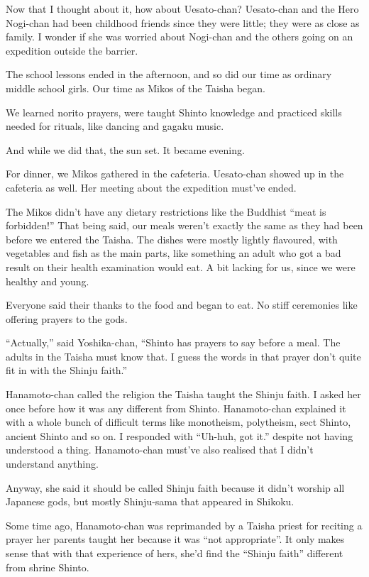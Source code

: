 Now that I thought about it, how about Uesato-chan? Uesato-chan and the Hero Nogi-chan had been childhood friends since they were little; they were as close as family. I wonder if she was worried about Nogi-chan and the others going on an expedition outside the barrier.

The school lessons ended in the afternoon, and so did our time as ordinary middle school girls. Our time as Mikos of the Taisha began.

We learned norito prayers, were taught Shinto knowledge and practiced skills needed for rituals, like dancing and gagaku music.

And while we did that, the sun set. It became evening.

For dinner, we Mikos gathered in the cafeteria. Uesato-chan showed up in the cafeteria as well. Her meeting about the expedition must've ended.

The Mikos didn't have any dietary restrictions like the Buddhist ``meat is forbidden!'' That being said, our meals weren't exactly the same as they had been before we entered the Taisha. The dishes were mostly lightly flavoured, with vegetables and fish as the main parts, like something an adult who got a bad result on their health examination would eat. A bit lacking for us, since we were healthy and young.

Everyone said their thanks to the food and began to eat. No stiff ceremonies like offering prayers to the gods.

``Actually,'' said Yoshika-chan, ``Shinto has prayers to say before a meal. The adults in the Taisha must know that. I guess the words in that prayer don't quite fit in with the Shinju faith.''

Hanamoto-chan called the religion the Taisha taught the Shinju faith. I asked her once before how it was any different from Shinto. Hanamoto-chan explained it with a whole bunch of difficult terms like monotheism, polytheism, sect Shinto, ancient Shinto and so on. I responded with ``Uh-huh, got it.'' despite not having understood a thing. Hanamoto-chan must've also realised that I didn't understand anything.

Anyway, she said it should be called Shinju faith because it didn't worship all Japanese gods, but mostly Shinju-sama that appeared in Shikoku.

Some time ago, Hanamoto-chan was reprimanded by a Taisha priest for reciting a prayer her parents taught her because it was ``not appropriate''. It only makes sense that with that experience of hers, she'd find the ``Shinju faith'' different from shrine Shinto.

